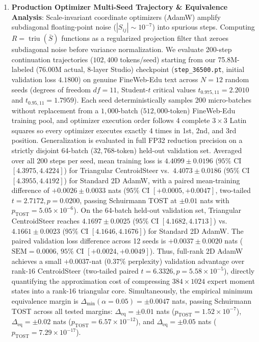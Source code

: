 \documentclass[10pt,twocolumn,letterpaper]{article}
\begin{document}
\begin{enumerate}
\begin{equation}
\begin{aligned}
\begin{cases}
            3.82 \times 10^{-7}, & \text{FineWeb-Edu (FP32)} \\
            1.84 \times 10^{-3}, & \text{FineWeb-Edu (BF16)} \\
            9.36 \times 10^{-9}, & \text{Synth.\ 12-Seed (FP32)} \\
            9.06 \times 10^{-5}, & \text{Synth.\ 12-Seed (BF16)}
        \end{cases}
    \end{aligned}
    \end{equation}
    \item \textbf{Production Optimizer Multi-Seed Trajectory \& Equivalence Analysis}: Scale-invariant coordinate optimizers (AdamW) amplify subdiagonal floating-point noise ($|S_{ij}| \sim 10^{-7}$) into spurious steps. Computing $R = \operatorname{triu}(\bar{S})$ functions as a regularized projection filter that zeroes subdiagonal noise before variance normalization. We evaluate 200-step continuation trajectories ($102,400$ tokens/seed) starting from our 75.8M-labeled (76.00M actual, 8-layer Studio) checkpoint (\texttt{step\_36500.pt}, initial validation loss $4.1800$) on genuine FineWeb-Edu text across $N=12$ random seeds (degrees of freedom $df = 11$, Student-$t$ critical values $t_{0.975, 11} = 2.2010$ and $t_{0.95, 11} = 1.7959$). Each seed deterministically samples 200 micro-batches without replacement from a $1,000$-batch ($512,000$-token) FineWeb-Edu training pool, and optimizer execution order follows 4 complete $3 \times 3$ Latin squares so every optimizer executes exactly 4 times in 1st, 2nd, and 3rd position. Generalization is evaluated in full FP32 reduction precision on a strictly disjoint 64-batch ($32,768$-token) held-out validation set.
    Averaged over all 200 steps per seed, mean training loss is $4.4099 \pm 0.0196$ ($95\%$ CI $[4.3975, 4.4224]$) for Triangular CentroidSteer vs.\ $4.4073 \pm 0.0186$ ($95\%$ CI $[4.3955, 4.4192]$) for Standard 2D AdamW, with a paired mean-training difference of $+0.0026 \pm 0.0033$ nats ($95\%$ CI $[+0.0005, +0.0047]$, two-tailed $t = 2.7172, p = 0.0200$, passing Schuirmann TOST at $\pm 0.01$ nats with $p_{\text{TOST}} = 5.05 \times 10^{-6}$).
    On the 64-batch held-out validation set, Triangular CentroidSteer reaches $4.1697 \pm 0.0025$ ($95\%$ CI $[4.1682, 4.1713]$) vs.\ $4.1661 \pm 0.0023$ ($95\%$ CI $[4.1646, 4.1676]$) for Standard 2D AdamW. The paired validation loss difference across 12 seeds is $+0.0037 \pm 0.0020$ nats ($\text{SEM} = 0.0006$, $95\%$ CI $[+0.0024, +0.0049]$).
    Thus, full-rank 2D AdamW achieves a small $+0.0037$-nat ($0.37\%$ perplexity) validation advantage over rank-$16$ CentroidSteer (two-tailed paired $t = 6.3326, p = 5.58 \times 10^{-5}$), directly quantifying the approximation cost of compressing $384 \times 1024$ expert moment states into a rank-$16$ triangular core. Simultaneously, the empirical minimum equivalence margin is $\Delta_{\min}(\alpha=0.05) = \pm 0.0047$ nats, passing Schuirmann TOST across all tested margins: $\Delta_{\text{eq}} = \pm 0.01$ nats ($p_{\text{TOST}} = 1.52 \times 10^{-7}$), $\Delta_{\text{eq}} = \pm 0.02$ nats ($p_{\text{TOST}} = 6.57 \times 10^{-12}$), and $\Delta_{\text{eq}} = \pm 0.05$ nats ($p_{\text{TOST}} = 7.29 \times 10^{-17}$).

\end{enumerate}
\end{document}
